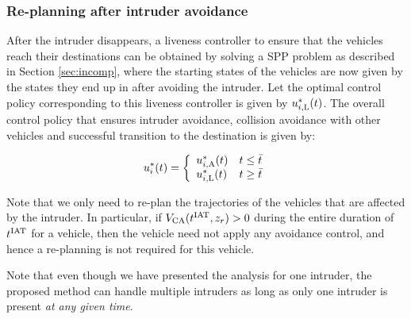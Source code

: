 \subsubsection{Re-planning after intruder avoidance\label{sec:replan_method1}} 
After the intruder disappears, a liveness controller to ensure that the vehicles reach their destinations can be obtained by solving a SPP problem as described in Section \ref{sec:incomp}, where the starting states of the vehicles are now given by the states they end up in after avoiding the intruder.  
Let the optimal control policy corresponding to this liveness controller is given by $u^*_{i, \text{L}}(t)$. The overall control policy that ensures intruder avoidance, collision avoidance with other vehicles and successful transition to the destination is given by:

\begin{equation*}
u_i^*(t) = 
\left \{ 
\begin{array}{ll}
u^*_{i, \text{A}}(t) & t \leq \bar{t}\\
u^*_{i, \text{L}}(t) & t \geq \bar{t}
\end{array}
\right.
\end{equation*}

\begin{remark}
Note that we only need to re-plan the trajectories of the vehicles that are affected by the intruder. In particular, if $V_\text{CA}(t^\text{IAT}, z_r) > 0$ during the entire duration of $t^\text{IAT}$ for a vehicle, then the vehicle need not apply any avoidance control, and hence a re-planning is not required for this vehicle. 
\end{remark}

\begin{remark}
Note that even though we have presented the analysis for one intruder, the proposed method can handle multiple intruders as long as only one intruder is present \textit{at any given time}. 
\end{remark}

